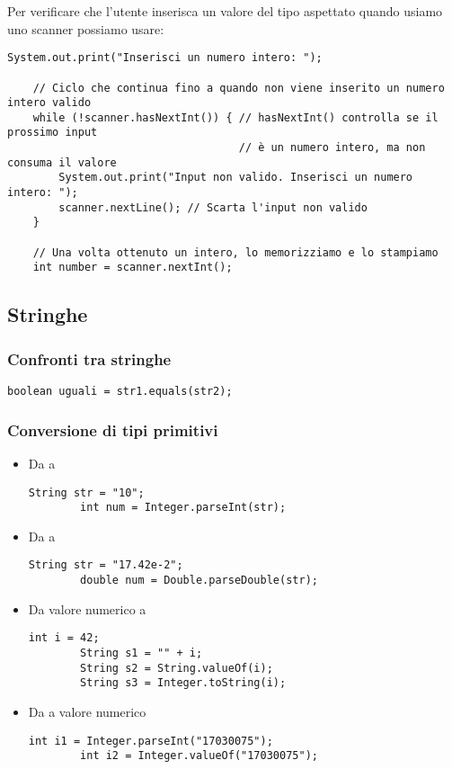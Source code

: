 \documentclass[../main.tex]{subfiles}
\begin{document}
Per verificare che l'utente inserisca un valore del tipo aspettato quando usiamo uno scanner possiamo usare:
\begin{lstlisting}[style=java]
    System.out.print("Inserisci un numero intero: ");

    // Ciclo che continua fino a quando non viene inserito un numero intero valido
    while (!scanner.hasNextInt()) { // hasNextInt() controlla se il prossimo input
                                    // è un numero intero, ma non consuma il valore
        System.out.print("Input non valido. Inserisci un numero intero: ");
        scanner.nextLine(); // Scarta l'input non valido
    }

    // Una volta ottenuto un intero, lo memorizziamo e lo stampiamo
    int number = scanner.nextInt();
\end{lstlisting}

\pagebreak
\subsection{Stringhe}
\subsubsection{Confronti tra stringhe}
\begin{lstlisting}[style=java]
    boolean uguali = str1.equals(str2);
\end{lstlisting}

\subsubsection{Conversione di tipi primitivi}
\begin{itemize}
    \item Da   a  \begin{lstlisting}[style=java]
        String str = "10";
        int num = Integer.parseInt(str);
    \end{lstlisting}
    \item Da   a  \begin{lstlisting}[style=java]
        String str = "17.42e-2";
        double num = Double.parseDouble(str);
    \end{lstlisting}
    \item Da valore numerico a  \begin{lstlisting}[style=java]
        int i = 42;
        String s1 = "" + i;
        String s2 = String.valueOf(i);
        String s3 = Integer.toString(i);
    \end{lstlisting}
    \item Da  a valore numerico \begin{lstlisting}[style=java]
        int i1 = Integer.parseInt("17030075");
        int i2 = Integer.valueOf("17030075");
    \end{lstlisting}
\end{itemize}
\end{document}
